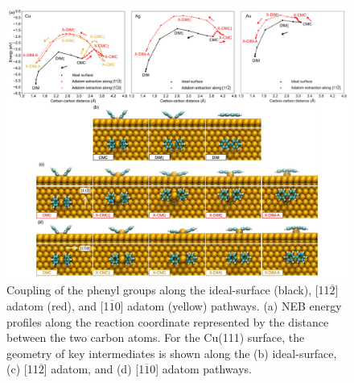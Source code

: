\documentclass[aps,prb,amsmath,amssymb,11pt]{revtex4-1}
\begin{document}
\begin{figure}[bt]
\centering
\includegraphics[width=1.0\textwidth]{Fig/distance-energy.pdf}
\caption{Coupling of the phenyl groups along the ideal-surface (black),  [11$\overline{2}$] adatom (red), and  [1$\overline{1}$0] adatom (yellow) pathways. (a) NEB energy profiles along the reaction coordinate represented by the distance between the two carbon atoms. For the Cu(111) surface, the geometry of key intermediates is shown along the (b) ideal-surface, (c) [11$\overline{2}$] adatom, and (d) [1$\overline{1}$0] adatom pathways.}
\label{fig:distance-energy}
\end{figure}
\end{document}
